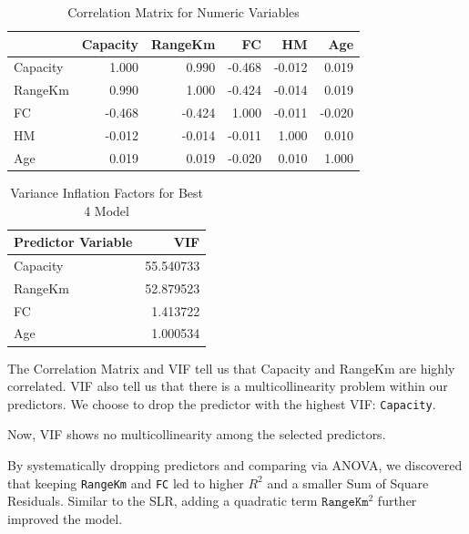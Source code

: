 \begin{table}[htbp]
  \centering
  \caption{Correlation Matrix for Numeric Variables}
  \begin{tabular}{lrrrrr}
    \toprule
    & \textbf{Capacity} & \textbf{RangeKm} & \textbf{FC} & \textbf{HM} & \textbf{Age} \\
    \midrule
    Capacity &  1.000 &  0.990 & -0.468 & -0.012 &  0.019 \\
    RangeKm  &  0.990 &  1.000 & -0.424 & -0.014 &  0.019 \\
    FC       & -0.468 & -0.424 &  1.000 & -0.011 & -0.020 \\
    HM       & -0.012 & -0.014 & -0.011 &  1.000 &  0.010 \\
    Age      &  0.019 &  0.019 & -0.020 &  0.010 &  1.000 \\
    \bottomrule
  \end{tabular}
  \label{tab:q3_06_cor}
\end{table}

\begin{table}[htbp]
  \centering
  \caption{Variance Inflation Factors for Best 4 Model}
  \begin{tabular}{lr}
    \toprule
    \textbf{Predictor Variable} & \textbf{VIF}   \\
    \midrule
    Capacity                   & 55.540733      \\
    RangeKm                    & 52.879523      \\
    FC                         & 1.413722       \\
    Age                        & 1.000534       \\
    \bottomrule
  \end{tabular}
  \label{tab:q3_06_vif}
\end{table}

The Correlation Matrix and VIF tell us that Capacity and RangeKm are highly correlated. VIF also tell us that there is a multicollinearity problem within our predictors. We choose to drop the predictor with the highest VIF: \texttt{Capacity}.

Now, VIF shows no multicollinearity among the selected predictors.

By systematically dropping predictors and comparing via ANOVA, we discovered that keeping \texttt{RangeKm} and \texttt{FC} led to higher $R^2$ and a smaller Sum of Square Residuals. Similar to the SLR, adding a quadratic term $\texttt{RangeKm}^2$ further improved the model.

